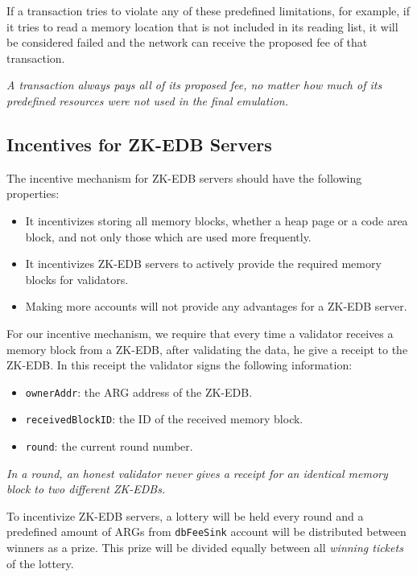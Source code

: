\documentclass[11pt, a4paper]{report}
\newcommand{\note}[1] {
    \begin{tcolorbox}[colframe=white,colback=white]
        \emph{#1}
    \end{tcolorbox}
}
\begin{document}
    If a transaction tries to violate any of these predefined limitations, for example, if it tries to read a memory
    location that is not included in its reading list, it will be considered failed and the network can receive the
    proposed fee of that transaction.

    \note{A transaction always pays all of its proposed fee, no matter how much of its predefined resources were not
    used in the final emulation.}

    \subsection{Incentives for ZK-EDB Servers}\label{subsec:zk-edb-servers}

    The incentive mechanism for ZK-EDB servers should have the following properties:

    \begin{itemize}
        \item It incentivizes storing all memory blocks, whether a heap page or a code area block, and not only those
        which are used more frequently.
        \item It incentivizes ZK-EDB servers to actively provide the required memory blocks for validators.
        \item Making more accounts will not provide any advantages for a ZK-EDB server.
    \end{itemize}

    For our incentive mechanism, we require that every time a validator receives a memory block from a ZK-EDB, after
    validating the data, he give a receipt to the ZK-EDB. In this receipt the validator signs the following information:

    \begin{itemize}
        \item \texttt{ownerAddr}: the ARG address of the ZK-EDB\@.
        \item \texttt{receivedBlockID}: the ID of the received memory block.
        \item \texttt{round}: the current round number.
    \end{itemize}

    \note{In a round, an honest validator never gives a receipt for an identical memory block to two different ZK-EDBs.}

    To incentivize ZK-EDB servers, a lottery will be held every round and a predefined amount of ARGs from
    \texttt{dbFeeSink} account will be distributed between winners as a prize. This prize will be divided equally
    between all \emph{winning tickets} of the lottery.
\end{document}
